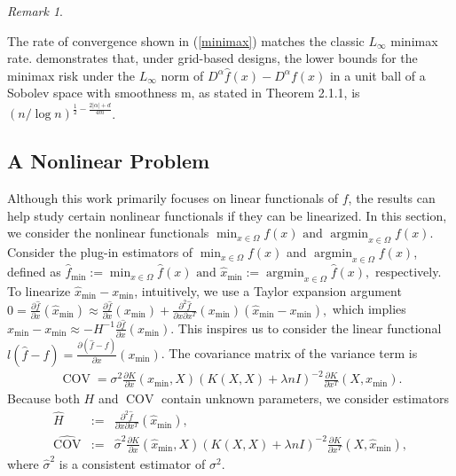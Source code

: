 \documentclass[12pt]{article}
\theoremstyle{plain}
\theoremstyle{remark}
\newtheorem{remark}{Remark}
\begin{document}
  
\begin{remark}\label{remark:uniform}
  
The rate of convergence shown in (\ref{minimax}) matches the classic  $L_\infty$ minimax rate.  \cite{nemirovski2000topics} demonstrates that, under grid-based designs, the lower bounds for the minimax risk under the   $L_\infty$  norm of $D^\alpha \hat{f}(x)-D^\alpha f(x)$ in  a unit ball of a Sobolev space with smoothness m, as stated in Theorem 2.1.1, is $(n/\log n)^{\frac{1}{2}-\frac{2|\alpha|+d}{4m}}$.  
\end{remark}





    




\subsection{A Nonlinear Problem}\label{sec:nonlinear}
Although this work primarily focuses on linear functionals of $f$, the results can help study certain nonlinear functionals if they can be linearized. In this section, we consider the nonlinear functionals
$\min_{x\in\Omega} f(x) \text{ and } \operatorname*{argmin}_{x\in\Omega}f(x)$.
Consider the plug-in estimators of $\min_{x\in\Omega} f(x)$ and $\operatorname*{argmin}_{x\in\Omega}f(x)$, defined as 
$\hat{f}_{\min}:=\min_{x\in\Omega} \hat{f}(x) \text{ and } \hat{x}_{\min}:=\operatorname*{argmin}_{x\in\Omega}\hat{f}(x),$
respectively. 
To linearize $\hat{x}_{\min}-x_{\min}$, intuitively, we use a Taylor expansion argument
$        0=\frac{\partial\hat{f}}{\partial x}(\hat{x}_{\min})\approx\frac{\partial\hat{f}}{\partial x}(x_{\min})+\frac{\partial^2\hat{f}}{\partial x\partial x^T}(x_{\min})(\hat{x}_{\min}-x_{\min}),
$
    which implies
    $\hat{x}_{\min}-x_{\min}\approx -H^{-1}\frac{\partial\hat{f}}{\partial x}(x_{\min})$.
This inspires us to consider the linear functional $l(\hat{f}-f)=\frac{\partial (\hat{f}-f)}{\partial x}(x_{\min})$. The covariance matrix of the variance term is
\begin{eqnarray}\label{Covnonlinear}
    \operatorname{COV}=\sigma^2\frac{\partial K}{\partial x}(x_{\min},X)(K(X,X)+\lambda n I)^{-2}\frac{\partial K}{\partial x^T}(X,x_{\min}).
\end{eqnarray}
Because both $H$ and $\operatorname{COV}$ contain unknown parameters, we consider estimators
\begin{eqnarray}
    \hat{H}&:=&\frac{\partial^2 \hat{f}}{\partial x\partial x^T}(\hat{x}_{\min}),\\
    \widehat{\operatorname{COV}}&:=&\hat{\sigma}^2\frac{\partial K}{\partial x}(\hat{x}_{\min},X)(K(X,X)+\lambda n I)^{-2}\frac{\partial K}{\partial x^T}(X,\hat{x}_{\min}),\label{Covestimate}
\end{eqnarray}
where $\hat{\sigma}^2$ is a consistent estimator of ${\sigma}^2$. 
\end{document}
